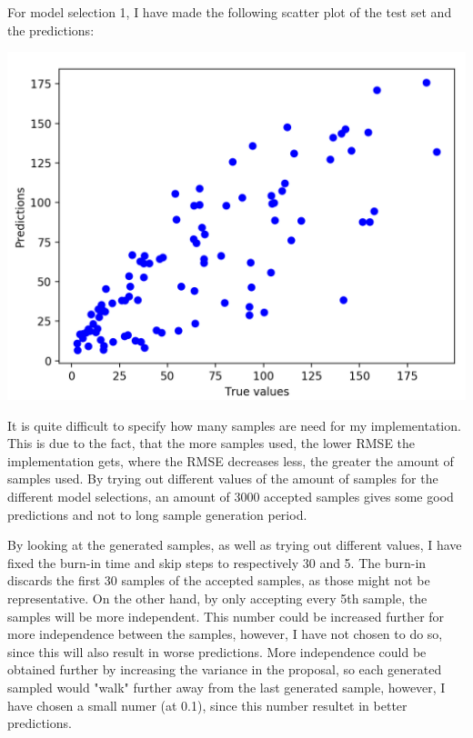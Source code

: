 \documentclass{report}
\begin{document}
For model selection 1, I have made the following scatter plot of the test set and the predictions:
\begin{center}
    \includegraphics[height = 7 cm]{5_5.png}
\end{center}

It is quite difficult to specify how many samples are need for my implementation. This is due to the fact, that the more samples used, the lower RMSE the implementation gets, where the RMSE decreases less, the greater the amount of samples used. By trying out different values of the amount of samples for the different model selections, an amount of 3000 accepted samples gives some good predictions and not to long sample generation period.

By looking at the generated samples, as well as trying out different values, I have fixed the burn-in time and skip steps to respectively 30 and 5. The burn-in discards the first 30 samples of the accepted samples, as those might not be representative. On the other hand, by only accepting every 5th sample, the samples will be more independent. This number could be increased further for more independence between the samples, however, I have not chosen to do so, since this will also result in worse predictions. More independence could be obtained further by increasing the variance in the proposal, so each generated sampled would "walk" further away from the last generated sample, however, I have chosen a small numer (at 0.1), since this number resultet in better predictions.
\end{document}
